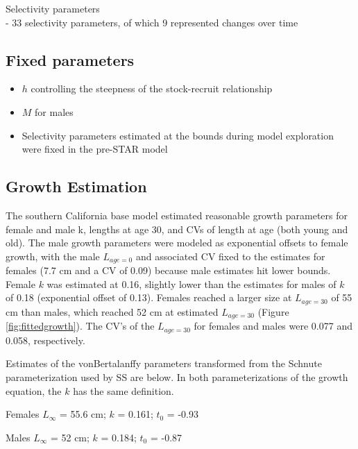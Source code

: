 \documentclass[
  english,
  a4paper,
]{article}
\providecommand{\tightlist}{%
  \setlength{\itemsep}{0pt}\setlength{\parskip}{0pt}}
\begin{document}
Selectivity parameters\\
- 33 selectivity parameters, of which
9 represented changes over time

\hypertarget{fixed-parameters}{%
\subsection{Fixed parameters}\label{fixed-parameters}}

\begin{itemize}
\tightlist
\item
  \(h\) controlling the steepness of the stock-recruit relationship
\item
  \(M\) for males
\item
  Selectivity parameters estimated at the bounds during model exploration were fixed in the pre-STAR model
\end{itemize}

\hypertarget{growth-estimation}{%
\subsection{Growth Estimation}\label{growth-estimation}}

The southern California base model estimated reasonable growth parameters for female and male k, lengths at age 30, and CVs of length at age (both young and old). The male growth parameters were modeled as exponential offsets to female growth, with the male \(L_{age=0}\) and associated CV fixed to the estimates for females (7.7 cm and a CV of 0.09) because male estimates hit lower bounds. Female \(k\) was estimated at 0.16, slightly lower than the estimates for males of \(k\) of 0.18 (exponential offset of 0.13). Females reached a larger size at \(L_{age=30}\) of 55 cm than males, which reached 52 cm at estimated \(L_{age=30}\) (Figure \ref{fig:fittedgrowth}). The CV's of the \(L_{age=30}\) for females and males were 0.077 and 0.058, respectively.

Estimates of the vonBertalanffy parameters transformed from the Schnute parameterization used by SS are below. In both parameterizations of the growth equation, the \(k\) has the same definition.

\begin{centering}

Females $L_{\infty}$ = 55.6 cm; $k$ = 0.161; $t_0$ = -0.93

Males $L_{\infty}$ = 52 cm; $k$ = 0.184; $t_0$ = -0.87

\end{centering}
\end{document}
